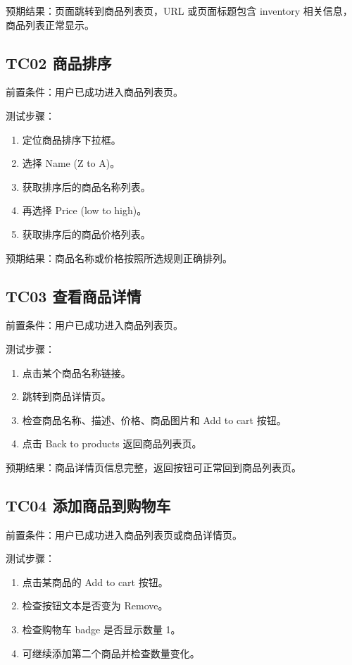 \documentclass[UTF8,a4paper,12pt]{ctexart}
\begin{document}
预期结果：页面跳转到商品列表页，URL 或页面标题包含 inventory 相关信息，商品列表正常显示。

\subsection{TC02 商品排序}

前置条件：用户已成功进入商品列表页。

测试步骤：

\begin{enumerate}
  \item 定位商品排序下拉框。
  \item 选择 Name (Z to A)。
  \item 获取排序后的商品名称列表。
  \item 再选择 Price (low to high)。
  \item 获取排序后的商品价格列表。
\end{enumerate}

预期结果：商品名称或价格按照所选规则正确排列。

\subsection{TC03 查看商品详情}

前置条件：用户已成功进入商品列表页。

测试步骤：

\begin{enumerate}
  \item 点击某个商品名称链接。
  \item 跳转到商品详情页。
  \item 检查商品名称、描述、价格、商品图片和 Add to cart 按钮。
  \item 点击 Back to products 返回商品列表页。
\end{enumerate}

预期结果：商品详情页信息完整，返回按钮可正常回到商品列表页。

\subsection{TC04 添加商品到购物车}

前置条件：用户已成功进入商品列表页或商品详情页。

测试步骤：

\begin{enumerate}
  \item 点击某商品的 Add to cart 按钮。
  \item 检查按钮文本是否变为 Remove。
  \item 检查购物车 badge 是否显示数量 1。
  \item 可继续添加第二个商品并检查数量变化。
\end{enumerate}
\end{document}
